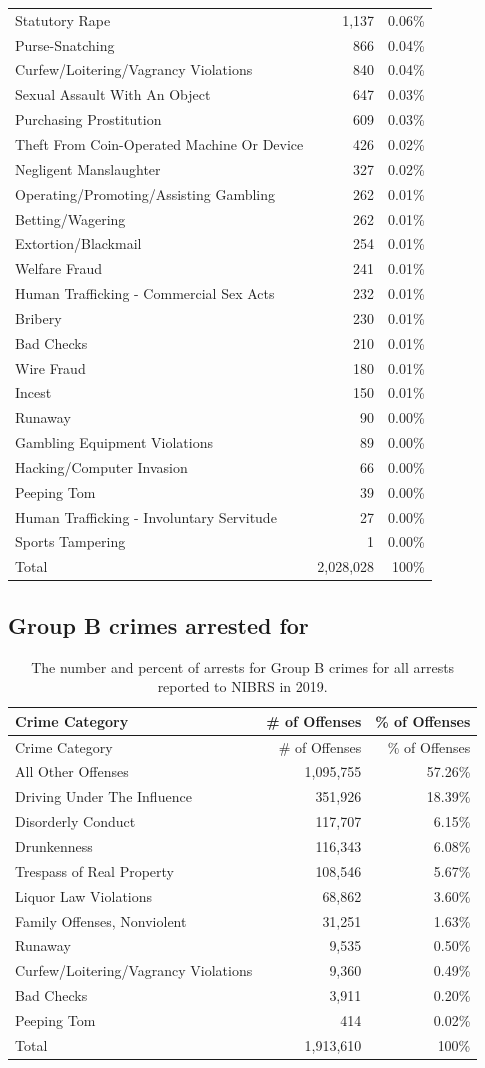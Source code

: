 \documentclass[
  12pt,
  openany]{book}
\begin{document}
\begin{longtable}[]{@{}lrr@{}}
Statutory Rape & 1,137 & 0.06\%\tabularnewline
Purse-Snatching & 866 & 0.04\%\tabularnewline
Curfew/Loitering/Vagrancy Violations & 840 & 0.04\%\tabularnewline
Sexual Assault With An Object & 647 & 0.03\%\tabularnewline
Purchasing Prostitution & 609 & 0.03\%\tabularnewline
Theft From Coin-Operated Machine Or Device & 426 & 0.02\%\tabularnewline
Negligent Manslaughter & 327 & 0.02\%\tabularnewline
Operating/Promoting/Assisting Gambling & 262 & 0.01\%\tabularnewline
Betting/Wagering & 262 & 0.01\%\tabularnewline
Extortion/Blackmail & 254 & 0.01\%\tabularnewline
Welfare Fraud & 241 & 0.01\%\tabularnewline
Human Trafficking - Commercial Sex Acts & 232 & 0.01\%\tabularnewline
Bribery & 230 & 0.01\%\tabularnewline
Bad Checks & 210 & 0.01\%\tabularnewline
Wire Fraud & 180 & 0.01\%\tabularnewline
Incest & 150 & 0.01\%\tabularnewline
Runaway & 90 & 0.00\%\tabularnewline
Gambling Equipment Violations & 89 & 0.00\%\tabularnewline
Hacking/Computer Invasion & 66 & 0.00\%\tabularnewline
Peeping Tom & 39 & 0.00\%\tabularnewline
Human Trafficking - Involuntary Servitude & 27 & 0.00\%\tabularnewline
Sports Tampering & 1 & 0.00\%\tabularnewline
Total & 2,028,028 & 100\%\tabularnewline
\bottomrule
\end{longtable}

\hypertarget{group-b-crimes-arrested-for}{%
\subsection{Group B crimes arrested for}\label{group-b-crimes-arrested-for}}

\begin{longtable}[]{@{}lrr@{}}
\caption{\label{tab:GroupBarresteeCrime}The number and percent of arrests for Group B crimes for all arrests reported to NIBRS in 2019.}\tabularnewline
\toprule
Crime Category & \# of Offenses & \% of Offenses\tabularnewline
\midrule
\endfirsthead
\toprule
Crime Category & \# of Offenses & \% of Offenses\tabularnewline
\midrule
\endhead
All Other Offenses & 1,095,755 & 57.26\%\tabularnewline
Driving Under The Influence & 351,926 & 18.39\%\tabularnewline
Disorderly Conduct & 117,707 & 6.15\%\tabularnewline
Drunkenness & 116,343 & 6.08\%\tabularnewline
Trespass of Real Property & 108,546 & 5.67\%\tabularnewline
Liquor Law Violations & 68,862 & 3.60\%\tabularnewline
Family Offenses, Nonviolent & 31,251 & 1.63\%\tabularnewline
Runaway & 9,535 & 0.50\%\tabularnewline
Curfew/Loitering/Vagrancy Violations & 9,360 & 0.49\%\tabularnewline
Bad Checks & 3,911 & 0.20\%\tabularnewline
Peeping Tom & 414 & 0.02\%\tabularnewline
Total & 1,913,610 & 100\%\tabularnewline
\bottomrule
\end{longtable}
\end{document}
